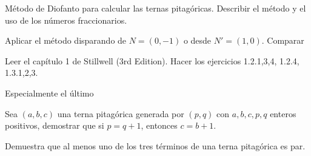 \begin{problem}[8]
Método de Diofanto para calcular las ternas pitagóricas. Describir el método y el uso de los números fraccionarios.

Aplicar el método disparando de $N=(0,-1)$ o desde $N'=(1,0)$. Comparar

\solution

\end{problem}

\begin{problem}[9]
Leer el capítulo 1 de Stillwell (3rd Edition). Hacer los ejercicios 1.2.{1,3,4}, 1.2.4, 1.3.{1,2,3}.

Especialmente el último

\solution

\end{problem}

\begin{problem}[10]
Sea $(a,b,c)$ una terna pitagórica generada por $(p,q)$ con $a,b,c,p,q$ enteros positivos, demostrar que si $p=q+1$, entonces $c=b+1$.

\solution

\end{problem}

\begin{problem}[11]
Demuestra que al menos uno de los tres términos de una terna pitagórica es par.

\solution

\end{problem}